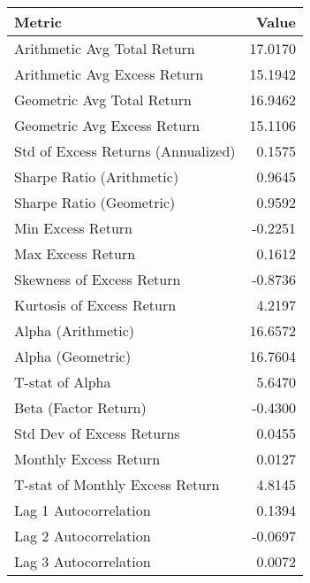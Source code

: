 \begin{tabular}{lr}
\toprule
Metric & Value \\
\midrule
Arithmetic Avg Total Return & 17.0170 \\
Arithmetic Avg Excess Return & 15.1942 \\
Geometric Avg Total Return & 16.9462 \\
Geometric Avg Excess Return & 15.1106 \\
Std of Excess Returns (Annualized) & 0.1575 \\
Sharpe Ratio (Arithmetic) & 0.9645 \\
Sharpe Ratio (Geometric) & 0.9592 \\
Min Excess Return & -0.2251 \\
Max Excess Return & 0.1612 \\
Skewness of Excess Return & -0.8736 \\
Kurtosis of Excess Return & 4.2197 \\
Alpha (Arithmetic) & 16.6572 \\
Alpha (Geometric) & 16.7604 \\
T-stat of Alpha & 5.6470 \\
Beta (Factor Return) & -0.4300 \\
Std Dev of Excess Returns & 0.0455 \\
Monthly Excess Return & 0.0127 \\
T-stat of Monthly Excess Return & 4.8145 \\
Lag 1 Autocorrelation & 0.1394 \\
Lag 2 Autocorrelation & -0.0697 \\
Lag 3 Autocorrelation & 0.0072 \\
\bottomrule
\end{tabular}
